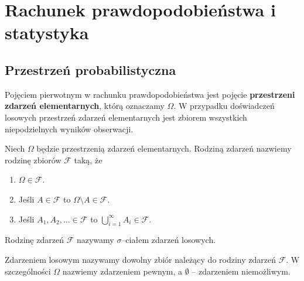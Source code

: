 \documentclass{myclass}
\numberwithin{equation}{section}
\begin{document}
\section{Rachunek prawdopodobieństwa i statystyka}


\subsection{Przestrzeń probabilistyczna}

Pojęciem pierwotnym w rachunku prawdopodobieństwa jest pojęcie \textbf{przestrzeni zdarzeń
elementarnych}, którą oznaczamy \(\Omega\). W przypadku doświadczeń losowych przestrzeń zdarzeń
elementarnych jest zbiorem wszystkich niepodzielnych wyników obserwacji.

\begin{definition}

Niech \(\Omega\) będzie przestrzenią zdarzeń elementarnych. Rodziną zdarzeń nazwiemy rodzinę zbiorów
\(\mathcal{F}\) taką, że
\begin{enumerate}
    
    \item \(\Omega \in \mathcal{F}\).
    
    \item Jeśli \(A \in \mathcal{F}\) to \(\Omega \setminus A \in \mathcal{F}\).
    
    \item Jeśli \(A_1,A_2,\ldots \in \mathcal{F}\) to \(\bigcup_{i=1}^\infty A_i \in \mathcal{F}\).

\end{enumerate}

Rodzinę zdarzeń \(\mathcal{F}\) nazywamy \(\sigma\)--ciałem zdarzeń losowych.

\end{definition}

\begin{definition}
    Zdarzeniem losowym nazywamy dowolny zbiór należący do rodziny zdarzeń \(\mathcal{F}\). W
    szczególności \(\Omega\) nazwiemy zdarzeniem pewnym, a \(\emptyset\) -- zdarzeniem niemożliwym.
\end{definition}
\end{document}
